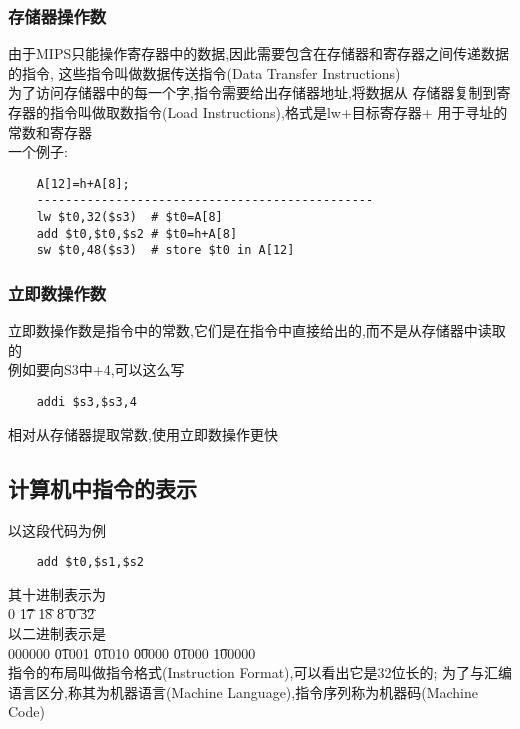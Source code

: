 \documentclass{ctexart}
\begin{document}
\subsubsection{存储器操作数}
由于MIPS只能操作寄存器中的数据,因此需要包含在存储器和寄存器之间传递数据的指令,
这些指令叫做数据传送指令(Data Transfer Instructions)\\
为了访问存储器中的每一个字,指令需要给出存储器地址,将数据从
存储器复制到寄存器的指令叫做取数指令(Load Instructions),格式是lw+目标寄存器+
用于寻址的常数和寄存器\\
一个例子:\\
\begin{lstlisting}
    A[12]=h+A[8];
    -----------------------------------------------
    lw $t0,32($s3)  # $t0=A[8]
    add $t0,$t0,$s2 # $t0=h+A[8]
    sw $t0,48($s3)  # store $t0 in A[12]
\end{lstlisting}
\subsubsection{立即数操作数}
立即数操作数是指令中的常数,它们是在指令中直接给出的,而不是从存储器中读取的\\
例如要向S3中+4,可以这么写
\begin{lstlisting}
    addi $s3,$s3,4
\end{lstlisting}
相对从存储器提取常数,使用立即数操作更快\\
\subsection{计算机中指令的表示}
以这段代码为例
\begin{lstlisting}
    add $t0,$s1,$s2
\end{lstlisting}
其十进制表示为\\
0 \t 17 \t 18 \t 8 \t 0 \t 32 \\
以二进制表示是\\
000000 \t 01001 \t 01010 \t 00000 \t 01000 \t 100000 \\
指令的布局叫做指令格式(Instruction Format),可以看出它是32位长的;
为了与汇编语言区分,称其为机器语言(Machine Language),指令序列称为机器码(Machine Code)\\
\end{document}
